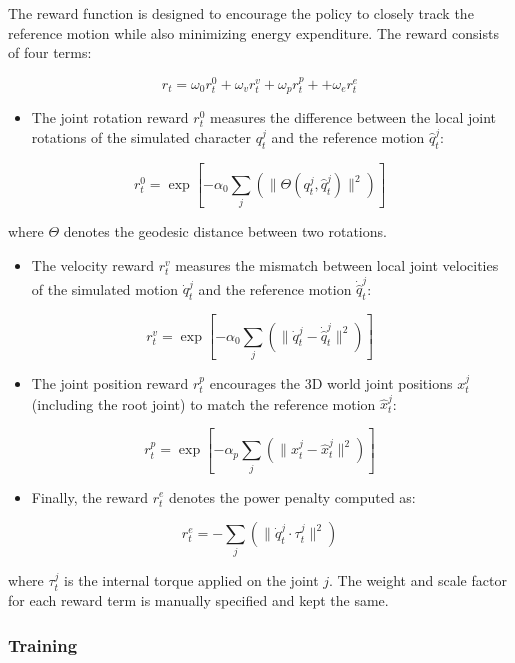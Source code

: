 \documentclass{article}
\begin{document}
The reward function is designed to encourage the policy to closely track the reference motion while also minimizing energy expenditure. The reward consists of four terms:

\[r_t = \omega_0 r_t^0 + \omega_v r_t^v + \omega_p r_t^p + + \omega_e r_t^e\]

\begin{itemize}
\tightlist
\item
  The joint rotation reward $r_t^0$ measures the difference between the local joint rotations of the simulated character $q_t^{j}$ and the reference motion $\hat{q}_t^{j}$:
\end{itemize}

\[ r_t^0 = \exp \left[ -\alpha_0 \sum_j \left( \| \Theta (q_t^{j}, \hat{q}_t^{j}) \|^2 \right) \right]\]

where $\Theta$ denotes the geodesic distance between two rotations.

\begin{itemize}
\tightlist
\item
  The velocity reward $r_t^v$ measures the mismatch between local joint velocities of the simulated motion $\dot{q}_t^{j}$ and the reference motion $\dot{\hat{q}}_t^{j}$:
\end{itemize}

\[ r_t^v = \exp \left[ -\alpha_0 \sum_j \left( \| \dot{q}_t^{j} - \dot{\hat{q}}_t^{j} \|^2 \right) \right]\]

\begin{itemize}
\tightlist
\item
  The joint position reward $r_t^p$ encourages the 3D world joint positions $x_t^{j}$ (including the root joint) to match the reference motion $\hat{x}_t^{j}$:
\end{itemize}

\[ r_t^p = \exp \left[ -\alpha_p \sum_j \left( \| x_t^{j} - \hat{x}_t^{j} \|^2 \right) \right]\]

\begin{itemize}
\tightlist
\item
  Finally, the reward $r_t^e$ denotes the power penalty computed as:
\end{itemize}

\[ r_t^e = -\sum_j \left( \| \dot{q}_t^{j} \cdot \tau_t^{j} \|^2 \right)\]

where $\tau_t^{j}$ is the internal torque applied on the joint $j$. The weight and scale factor for each reward term is manually specified and kept the same.

\subsubsection{Training}\label{training}
\end{document}
